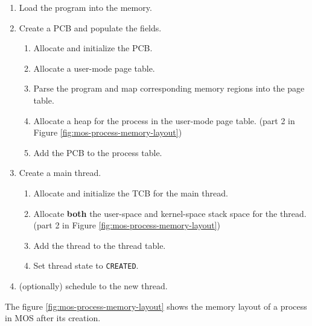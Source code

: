 \begin{enumerate}
    \item Load the program into the memory.
    \item Create a PCB and populate the fields.
          \begin{enumerate}
              \item Allocate and initialize the PCB.
              \item Allocate a user-mode page table.
              \item Parse the program and map corresponding memory regions into the page table.
              \item Allocate a heap for the process in the user-mode page table.
                    (part 2 in Figure \ref{fig:mos-process-memory-layout})
              \item Add the PCB to the process table.
          \end{enumerate}
    \item Create a main thread.
          \begin{enumerate}
              \item Allocate and initialize the TCB for the main thread.
              \item Allocate \textbf{both} the user-space and kernel-space stack space for the thread.
                    (part 2 in Figure \ref{fig:mos-process-memory-layout})
              \item Add the thread to the thread table.
              \item Set thread state to \texttt{CREATED}.
          \end{enumerate}
    \item (optionally) schedule to the new thread.
\end{enumerate}

The figure \ref{fig:mos-process-memory-layout} shows the memory layout of a process in MOS
after its creation.

